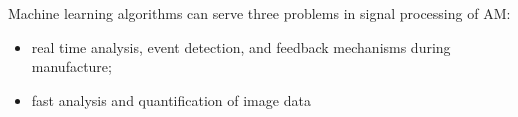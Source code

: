 Machine learning algorithms can serve three problems in signal processing of AM:
\begin{itemize}
	\item real time analysis, event detection, and feedback mechanisms during manufacture;
	\item fast analysis and quantification of image data
\end{itemize}




 


